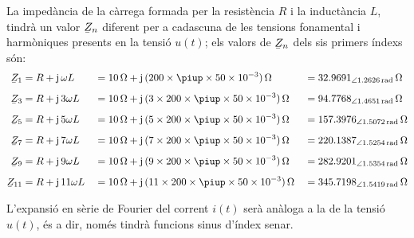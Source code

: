 \begin{exemple}
    La impedància de la càrrega formada per la resistència $R$ i la
    inductància $L$, tindrà un valor $\cmplx{Z}_n$ diferent per a
    cadascuna de les tensions fonamental i harmòniques presents en la
    tensió $u(t)$; els valors de $\cmplx{Z}_n$ dels sis primers índexs són:
    \begin{alignat*}{3}
        \cmplx{Z}_1 &= R + \ju\, \omega L &&= \qty{10}{\ohm} + \ju\, (200\times \piup\times 50\times 10^{-3})\unit{\,\ohm} &&=
        \qtypr{32,9691}{1,2626}{\ohm}\\[1ex]
        \cmplx{Z}_3 &= R + \ju\, 3 \omega L &&= \qty{10}{\ohm} + \ju\, (3\times 200\times \piup\times 50\times 10^{-3})\unit{\,\ohm} &&=
        \qtypr{94,7768}{1,4651}{\ohm}\\[1ex]
        \cmplx{Z}_5 &= R + \ju\, 5 \omega L &&= \qty{10}{\ohm} + \ju\, (5\times 200\times \piup\times 50\times 10^{-3})\unit{\,\ohm} &&=
        \qtypr{157,3976}{1,5072}{\ohm}\\[1ex]
        \cmplx{Z}_7 &= R + \ju\, 7 \omega L &&= \qty{10}{\ohm} + \ju\, (7\times 200\times \piup\times 50\times 10^{-3})\unit{\,\ohm} &&=
        \qtypr{220,1387}{1,5254}{\ohm}\\[1ex]
        \cmplx{Z}_9 &= R + \ju\, 9 \omega L &&= \qty{10}{\ohm} + \ju\, (9\times 200\times \piup\times 50\times 10^{-3})\unit{\,\ohm} &&=
        \qtypr{282,9201}{1,5354}{\ohm}\\[1ex]
        \cmplx{Z}_{11} &= R + \ju\, 11 \omega L &&= \qty{10}{\ohm} + \ju\, (11\times 200\times \piup\times 50\times 10^{-3})\unit{\,\ohm} &&=
        \qtypr{345,7198}{1,5419}{\ohm}
    \end{alignat*}

    L'expansió en sèrie de Fourier del corrent $i(t)$ serà anàloga a la
    de la tensió $u(t)$, és a dir, només tindrà funcions sinus
    d'índex senar.


\end{exemple}
